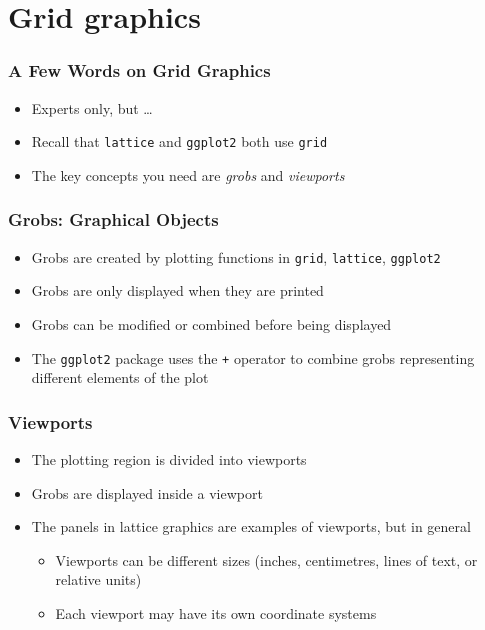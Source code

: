 \documentclass[xcolor=svgnames]{beamer}
\newcommand{\code}[1]{\texttt{#1}}
\begin{document}
\section{Grid graphics}

\begin{frame}
  \frametitle{A Few Words on Grid Graphics}

  \begin{itemize}
  \item Experts only, but \dots
  \item Recall that \code{lattice} and \code{ggplot2} both use \code{grid}
  \item The key concepts you need are {\em grobs} and {\em viewports}
  \end{itemize}

\end{frame}

\begin{frame}
  \frametitle{Grobs: Graphical Objects}

  \begin{itemize}
  \item Grobs are created by plotting functions in \code{grid}, \code{lattice},
        \code{ggplot2}
  \item Grobs are only displayed when they are printed
  \item Grobs can be modified or combined before being displayed
  \item The \code{ggplot2} package uses the \code{+} operator to combine
        grobs representing different elements of the plot
  \end{itemize}

\end{frame}

\begin{frame}
  \frametitle{Viewports}

  \begin{itemize}
  \item The plotting region is divided into viewports
  \item Grobs are displayed inside a viewport
  \item The panels in lattice graphics are examples of viewports, but
        in general
        \begin{itemize}
        \item Viewports can be different sizes (inches, centimetres,
        lines of text, or relative units)
        \item Each viewport may have its own coordinate systems
        \end{itemize}
  \end{itemize}

\end{frame}
\end{document}
